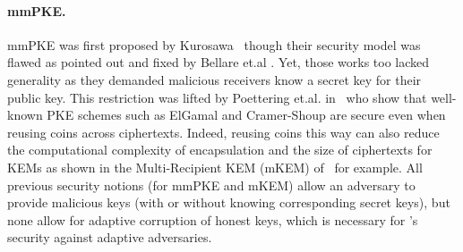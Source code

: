

\paragraph{mmPKE.}
mmPKE was first proposed by Kurosawa~\cite{PKC:Kurosawa02} though their
security model was flawed as pointed out and fixed by Bellare et.al
\cite{PKC:BelBolSta03,IEEE:BelBolKur07}. Yet, those works too lacked
generality as they demanded malicious receivers know a secret key for their
public key. This restriction was lifted by Poettering et.al.
in~\cite{ASIACCS:PinPoeSch14} who show that well-known PKE schemes such as
ElGamal\cite{C:ElGamal84} and Cramer-Shoup \cite{EC:CraSho02} are secure even
when reusing coins across ciphertexts. Indeed, reusing coins this way can
also reduce the computational complexity of encapsulation and the size of
ciphertexts for KEMs as shown in the Multi-Recipient KEM (mKEM)
of~\cite{SCN:Smart04,ICICS:CLQY18a,AC:KKPP20} for example.
%
All previous security notions (for mmPKE and mKEM) allow an adversary to
provide malicious keys (with or without knowing corresponding secret keys),
but none allow for adaptive corruption of honest keys, which is necessary for
\protITK's security against adaptive adversaries.


